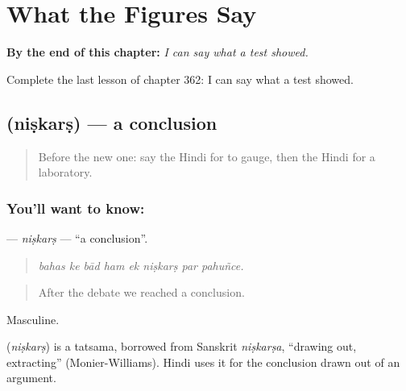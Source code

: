 
\chapter{What the Figures Say}
\label{ch:hi-what-the-figures-say}

\begin{chapteropening}
\textbf{By the end of this chapter:} \emph{I can say what a test showed.}

Complete the last lesson of chapter 362: I can say what a test showed.
\end{chapteropening}

\section[\texorpdfstring{\hi{निष्कर्ष} (niṣkarṣ)}{निष्कर्ष (niṣkarṣ)}]{ (niṣkarṣ) — a conclusion}

\label{lesson:HI-C362-niskars}



\begin{quote}
Before the new one: say the Hindi for to gauge, then the Hindi for a laboratory.
\end{quote}

\subsection*{You'll want to know: }
\textbf{} — \emph{niṣkarṣ} — \textquotedblleft{}a conclusion\textquotedblright{}.

\begin{quote}
       
\end{quote}

\begin{quote}
\emph{bahas ke bād ham ek niṣkarṣ par pahuñce.}
\end{quote}

\begin{quote}
After the debate we reached a conclusion.
\end{quote}

Masculine.

\begin{cousinweb}
\textbf{} (\emph{niṣkarṣ}) is a tatsama, borrowed from Sanskrit \emph{niṣkarṣa}, \textquotedblleft{}drawing out, extracting\textquotedblright{} (Monier-Williams). Hindi uses it for the conclusion drawn out of an argument.
\end{cousinweb}

